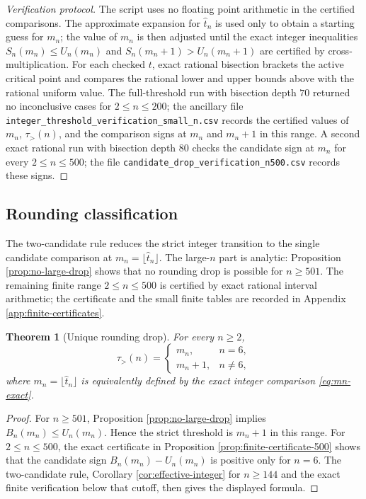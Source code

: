 \documentclass[11pt]{article}
\newtheorem{theorem}{Theorem}[section]
\theoremstyle{definition}
\begin{document}
\begin{proof}[Verification protocol]
The script uses no floating point arithmetic in the certified comparisons.  The approximate expansion for $\widehat t_n$ is used only to obtain a starting guess for $m_n$; the value of $m_n$ is then adjusted until the exact integer inequalities $S_n(m_n)\le U_n(m_n)$ and $S_n(m_n+1)>U_n(m_n+1)$ are certified by cross-multiplication.  For each checked $t$, exact rational bisection brackets the active critical point and compares the rational lower and upper bounds above with the rational uniform value.  The full-threshold run with bisection depth $70$ returned no inconclusive cases for $2\le n\le 200$; the ancillary file \texttt{integer\_threshold\_verification\_small\_n.csv} records the certified values of $m_n$, $\tau_>(n)$, and the comparison signs at $m_n$ and $m_n+1$ in this range.  A second exact rational run with bisection depth $80$ checks the candidate sign at $m_n$ for every $2\le n\le 500$; the file \texttt{candidate\_drop\_verification\_n500.csv} records these signs.
\end{proof}



\subsection{Rounding classification}

The two-candidate rule reduces the strict integer transition to the single candidate
comparison at \(m_n=\lfloor\widehat t_n\rfloor\).  The large-\(n\) part is
analytic: Proposition \ref{prop:no-large-drop} shows that no rounding drop is
possible for \(n\ge501\).  The remaining finite range \(2\le n\le500\) is
certified by exact rational interval arithmetic; the certificate and the small
finite tables are recorded in Appendix \ref{app:finite-certificates}.

\begin{theorem}[Unique rounding drop]\label{thm:unique-rounding-drop}
For every \(n\ge2\),
\[
  \boxed{
  \tau_>(n)=
  \begin{cases}
  m_n, & n=6,\\[1mm]
  m_n+1, & n\ne6,
  \end{cases}}
\]
where \(m_n=\lfloor\widehat t_n\rfloor\) is equivalently defined by the exact
integer comparison \eqref{eq:mn-exact}.
\end{theorem}

\begin{proof}
For \(n\ge501\), Proposition \ref{prop:no-large-drop} implies
\(B_n(m_n)\le U_n(m_n)\).  Hence the strict threshold is \(m_n+1\) in this
range.  For \(2\le n\le500\), the exact certificate in Proposition
\ref{prop:finite-certificate-500} shows that the candidate sign
\(B_n(m_n)-U_n(m_n)\) is positive only for \(n=6\).  The two-candidate rule,
Corollary \ref{cor:effective-integer} for \(n\ge144\) and the exact finite
verification below that cutoff, then gives the displayed formula.
\end{proof}
\end{document}
